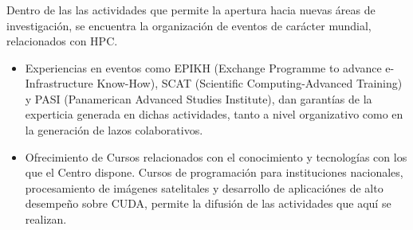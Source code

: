 \frame
{
\frametitle{}

Dentro de las las actividades que permite la apertura hacia nuevas áreas de investigación,
 se encuentra la organización de eventos de carácter mundial, relacionados con HPC.

\begin{itemize}

\item <1-> Experiencias en eventos como EPIKH (Exchange Programme to advance e-Infrastructure Know-How), 
SCAT (Scientific Computing-Advanced Training) y PASI (Panamerican Advanced Studies Institute), 
dan garantías de la experticia generada en dichas actividades, tanto a nivel organizativo como en la generación
de lazos colaborativos.

\item <2-> Ofrecimiento de Cursos relacionados con el conocimiento y tecnologías con los que el Centro dispone. 
Cursos de programación para instituciones nacionales, procesamiento de imágenes satelitales y 
desarrollo de aplicaciónes de alto desempeño sobre CUDA, permite la difusión de las actividades que aquí se realizan.

\end{itemize}

}


